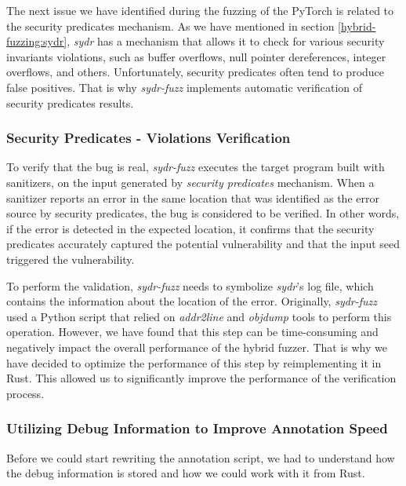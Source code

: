 The next issue we have identified during the fuzzing of the PyTorch is related to the security predicates mechanism. As we have mentioned in section \ref{hybrid-fuzzing:sydr}, \textit{sydr} has a mechanism that allows it to check for various security invariants violations, such as buffer overflows, null pointer dereferences, integer overflows, and others. Unfortunately, security predicates often tend to produce false positives. That is why \textit{sydr-fuzz} implements automatic verification of security predicates results.

\subsubsection{Security Predicates - Violations Verification}

To verify that the bug is real, \textit{sydr-fuzz} executes the target program built with sanitizers, on the input generated by \textit{security predicates} mechanism. When a sanitizer reports an error in the same location that was identified as the error source by security predicates, the bug is considered to be verified. In other words, if the error is detected in the expected location, it confirms that the security predicates accurately captured the potential vulnerability and that the input seed triggered the vulnerability.

To perform the validation, \textit{sydr-fuzz} needs to symbolize \textit{sydr}'s log file, which contains the information about the location of the error. Originally, \textit{sydr-fuzz} used a Python script that relied on \textit{addr2line} and \textit{objdump} tools to perform this operation. However, we have found that this step can be time-consuming and negatively impact the overall performance of the hybrid fuzzer. That is why we have decided to optimize the performance of this step by reimplementing it in Rust. This allowed us to significantly improve the performance of the verification process.

\subsubsection{Utilizing Debug Information to Improve Annotation Speed}

Before we could start rewriting the annotation script, we had to understand how the debug information is stored and how we could work with it from Rust.


